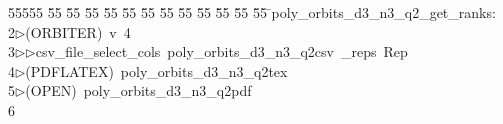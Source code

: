 %
%
\begin{tabbing}
55555 \= 55 \= 55 \= 55 \= 55 \= 55 \= 55 \= 55 \= 55 \= 55 \= 55 \= 55 \= 55 \= \>poly\_orbits\_d3\_n3\_q2\_get\_ranks:\\[0pt]
2\>$\triangleright$\>(ORBITER)\ v\ 4\ \\[0pt]
3\>$\triangleright$\>$\triangleright$\>csv\_file\_select\_cols\ poly\_orbits\_d3\_n3\_q2csv\ \_reps\ Rep\\[0pt]
4\>$\triangleright$\>(PDFLATEX)\ poly\_orbits\_d3\_n3\_q2tex\\[0pt]
5\>$\triangleright$\>(OPEN)\ poly\_orbits\_d3\_n3\_q2pdf\\[0pt]
6\>\end{tabbing}
